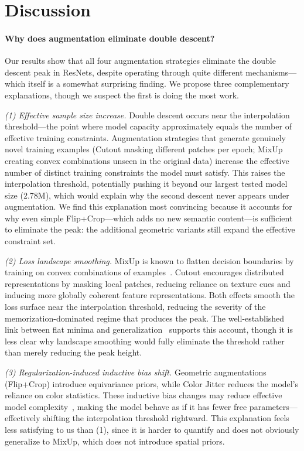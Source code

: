 \section{Discussion}
\label{sec:discussion}

\paragraph{Why does augmentation eliminate double descent?}
Our results show that all four augmentation strategies eliminate the double descent peak in ResNets, despite operating through quite different mechanisms---which itself is a somewhat surprising finding. We propose three complementary explanations, though we suspect the first is doing the most work.

\textit{(1) Effective sample size increase.} Double descent occurs near the interpolation threshold---the point where model capacity approximately equals the number of effective training constraints. Augmentation strategies that generate genuinely novel training examples (Cutout masking different patches per epoch; MixUp creating convex combinations unseen in the original data) increase the effective number of distinct training constraints the model must satisfy. This raises the interpolation threshold, potentially pushing it beyond our largest tested model size (2.78M), which would explain why the second descent never appears under augmentation. We find this explanation most convincing because it accounts for why even simple Flip+Crop---which adds no new semantic content---is sufficient to eliminate the peak: the additional geometric variants still expand the effective constraint set.

\textit{(2) Loss landscape smoothing.} MixUp is known to flatten decision boundaries by training on convex combinations of examples~\cite{zhang2018mixup}. Cutout encourages distributed representations by masking local patches, reducing reliance on texture cues and inducing more globally coherent feature representations. Both effects smooth the loss surface near the interpolation threshold, reducing the severity of the memorization-dominated regime that produces the peak. The well-established link between flat minima and generalization~\cite{foret2021sharpness,li2018visualizing} supports this account, though it is less clear why landscape smoothing would fully eliminate the threshold rather than merely reducing the peak height.

\textit{(3) Regularization-induced inductive bias shift.} Geometric augmentations (Flip+Crop) introduce equivariance priors, while Color Jitter reduces the model's reliance on color statistics. These inductive bias changes may reduce effective model complexity~\cite{nakkiran2020deep}, making the model behave as if it has fewer free parameters---effectively shifting the interpolation threshold rightward. This explanation feels less satisfying to us than (1), since it is harder to quantify and does not obviously generalize to MixUp, which does not introduce spatial priors.

